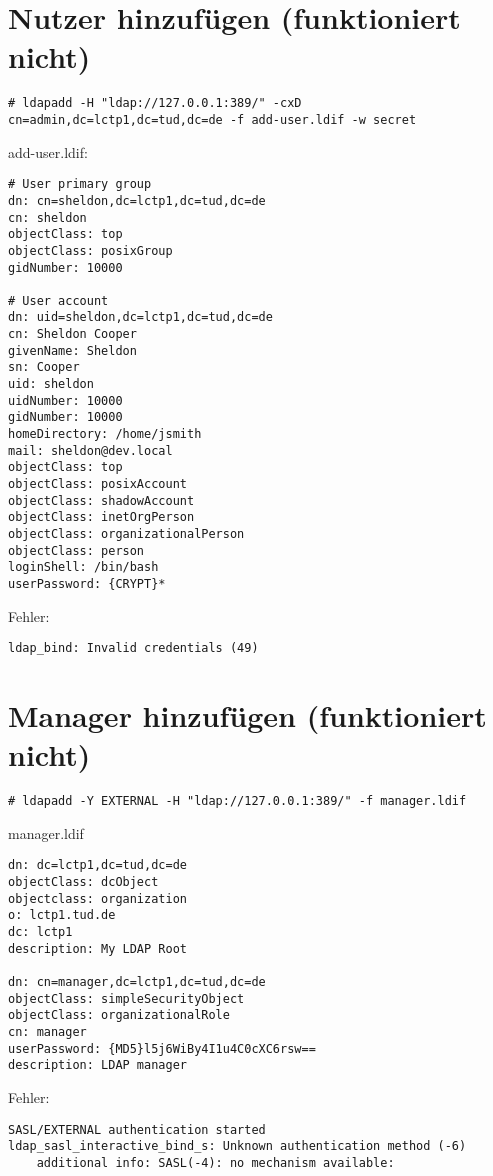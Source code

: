 \section*{Nutzer hinzufügen (funktioniert nicht)}
\begin{lstlisting}[style=Bash]
# ldapadd -H "ldap://127.0.0.1:389/" -cxD cn=admin,dc=lctp1,dc=tud,dc=de -f add-user.ldif -w secret
\end{lstlisting}
add-user.ldif:
\begin{lstlisting}[style=Bash]
# User primary group
dn: cn=sheldon,dc=lctp1,dc=tud,dc=de
cn: sheldon
objectClass: top
objectClass: posixGroup
gidNumber: 10000

# User account
dn: uid=sheldon,dc=lctp1,dc=tud,dc=de
cn: Sheldon Cooper
givenName: Sheldon
sn: Cooper
uid: sheldon
uidNumber: 10000
gidNumber: 10000
homeDirectory: /home/jsmith
mail: sheldon@dev.local
objectClass: top
objectClass: posixAccount
objectClass: shadowAccount
objectClass: inetOrgPerson
objectClass: organizationalPerson
objectClass: person
loginShell: /bin/bash
userPassword: {CRYPT}*
\end{lstlisting}
Fehler:
\begin{lstlisting}[style=Bash]
ldap_bind: Invalid credentials (49)
\end{lstlisting}
\section*{Manager hinzufügen (funktioniert nicht)}
\begin{lstlisting}[style=Bash]
# ldapadd -Y EXTERNAL -H "ldap://127.0.0.1:389/" -f manager.ldif
\end{lstlisting}
manager.ldif
\begin{lstlisting}[style=Bash]
dn: dc=lctp1,dc=tud,dc=de
objectClass: dcObject
objectclass: organization
o: lctp1.tud.de
dc: lctp1
description: My LDAP Root

dn: cn=manager,dc=lctp1,dc=tud,dc=de
objectClass: simpleSecurityObject
objectClass: organizationalRole
cn: manager
userPassword: {MD5}l5j6WiBy4I1u4C0cXC6rsw==
description: LDAP manager
\end{lstlisting}
Fehler:
\begin{lstlisting}[style=Bash]
SASL/EXTERNAL authentication started
ldap_sasl_interactive_bind_s: Unknown authentication method (-6)
	additional info: SASL(-4): no mechanism available: 
\end{lstlisting}
